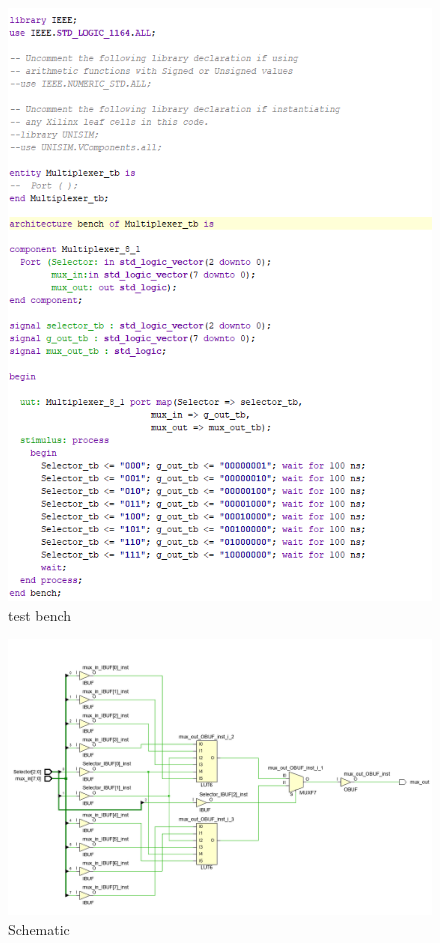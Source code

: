 \documentclass{article}
\begin{document}
\begin{figure}[h]
\begin{center}
\includegraphics[width=1\textwidth]{MultiplexerTestSource.png} %
\caption{test bench}
\end{center}
\end{figure}

\begin{figure}[h]
\begin{center}
\includegraphics[width=1\textwidth]{MultiplexerSchematic.png} %
\caption{Schematic}
\end{center}
\end{figure}
\end{document}

